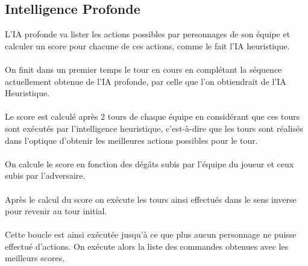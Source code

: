 \subsection{Intelligence Profonde}

L'IA profonde va lister les actions possibles par personnages 
de son équipe et calculer un score pour chacune de ces actions, comme le
fait l'IA heuristique. 
\\\\
On finit dans un premier temps le tour en cours en complétant la séquence
actuellement obtenue de l'IA profonde, par celle que l'on obtiendrait de
l'IA Heuristique.
\\\\
Le score est calculé après 2 tours de chaque équipe en considérant que
ces tours sont exécutés par l'intelligence heuristique, c'est-à-dire que
les tours sont réalisés dans l'optique d'obtenir les meilleures actions
possibles pour le tour.
\\\\
On calcule le score en fonction des dégâts subis par l'équipe du joueur
et ceux subis par l'adversaire.
\\\\
Après le calcul du score on exécute les tours ainsi effectués dans le
sens inverse pour revenir au tour initial.
\\\\
Cette boucle est ainsi exécutée jusqu'à ce que plus aucun personnage ne 
puisse effectué d'actions. On exécute alors la liste des commandes
obtenues avec les meilleurs scores.

